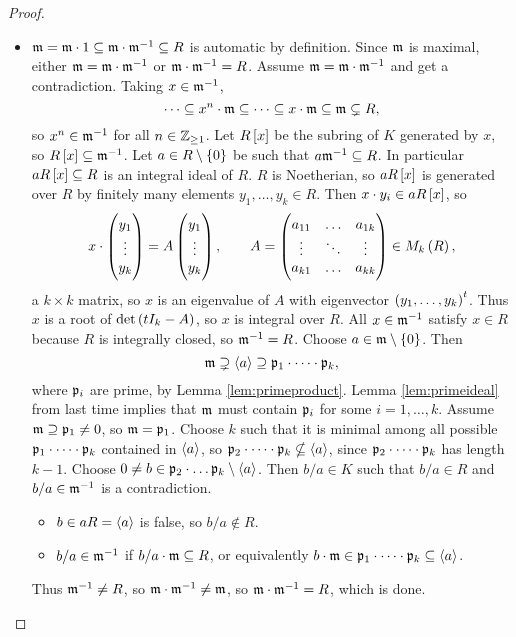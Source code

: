 \begin{proof}
\begin{itemize}
\item $ \mathfrak{m} = \mathfrak{m} \cdot 1 \subseteq \mathfrak{m} \cdot \mathfrak{m}^{-1} \subseteq R $ is automatic by definition. Since $ \mathfrak{m} $ is maximal, either $ \mathfrak{m} = \mathfrak{m} \cdot \mathfrak{m}^{-1} $ or $ \mathfrak{m} \cdot \mathfrak{m}^{-1} = R $. Assume $ \mathfrak{m} = \mathfrak{m} \cdot \mathfrak{m}^{-1} $ and get a contradiction. Taking $ x \in \mathfrak{m}^{-1} $,
$$ \dots \subseteq x^n \cdot \mathfrak{m} \subseteq \dots \subseteq x \cdot \mathfrak{m} \subseteq \mathfrak{m} \subsetneq R, $$
so $ x^n \in \mathfrak{m}^{-1} $ for all $ n \in \mathbb{Z}_{\ge 1} $. Let $ R\sbr{x} $ be the subring of $ K $ generated by $ x $, so $ R\sbr{x} \subseteq \mm^{-1} $. Let $ a \in R \setminus \cbr{0} $ be such that $ a\mathfrak{m}^{-1} \subseteq R $. In particular $ aR\sbr{x} \subseteq R $ is an integral ideal of $ R $. $ R $ is Noetherian, so $ aR\sbr{x} $ is generated over $ R $ by finitely many elements $ y_1, \dots, y_k \in R $. Then $ x \cdot y_i \in aR\sbr{x} $, so
$$ x \cdot \threebyone{y_1}{\vdots}{y_k} = A\threebyone{y_1}{\vdots}{y_k}, \qquad A = \threebythree{a_{11}}{\dots}{a_{1k}}{\vdots}{\ddots}{\vdots}{a_{k1}}{\dots}{a_{kk}} \in M_k\br{R}, $$
a $ k \times k $ matrix, so $ x $ is an eigenvalue of $ A $ with eigenvector $ \br{y_1, \dots, y_k}^t $. Thus $ x $ is a root of $ \det\br{tI_k - A} $, so $ x $ is integral over $ R $. All $ x \in \mathfrak{m}^{-1} $ satisfy $ x \in R $ because $ R $ is integrally closed, so $ \mathfrak{m}^{-1} = R $. Choose $ a \in \mm \setminus \cbr{0} $. Then
$$ \mathfrak{m} \supsetneq \left\langle a \right\rangle \supseteq \mathfrak{p}_1 \cdot \dots \cdot \mathfrak{p}_k, $$
where $ \mathfrak{p}_i $ are prime, by Lemma \ref{lem:primeproduct}. Lemma \ref{lem:primeideal} from last time implies that $ \mathfrak{m} $ must contain $ \mathfrak{p}_i $ for some $ i = 1, \dots, k $. Assume $ \mathfrak{m} \supseteq \mathfrak{p}_1 \ne 0 $, so $ \mathfrak{m} = \mathfrak{p}_1 $. Choose $ k $ such that it is minimal among all possible $ \mathfrak{p}_1 \cdot \dots \cdot \mathfrak{p}_k $ contained in $ \left\langle a \right\rangle $, so $ \mathfrak{p}_2 \cdot \dots \cdot \mathfrak{p}_k \nsubseteq \left\langle a \right\rangle $, since $ \mathfrak{p}_2 \cdot \dots \cdot \mathfrak{p}_k $ has length $ k - 1 $. Choose $ 0 \ne b \in \mathfrak{p}_2 \cdot \dots \mathfrak{p}_k \setminus \left\langle a \right\rangle $. Then $ b / a \in K $ such that $ b / a \in R $ and $ b / a \in \mathfrak{m}^{-1} $ is a contradiction.
\begin{itemize}
\item $ b \in aR = \left\langle a \right\rangle $ is false, so $ b / a \notin R $.
\item $ b / a \in \mathfrak{m}^{-1} $ if $ b / a \cdot \mathfrak{m} \subseteq R $, or equivalently $ b \cdot \mathfrak{m} \in \mathfrak{p}_1 \cdot \dots \cdot \mathfrak{p}_k \subseteq \left\langle a \right\rangle $.
\end{itemize}
Thus $ \mathfrak{m}^{-1} \ne R $, so $ \mathfrak{m} \cdot \mathfrak{m}^{-1} \ne \mathfrak{m} $, so $ \mathfrak{m} \cdot \mathfrak{m}^{-1} = R $, which is done.
\end{itemize}
\end{proof}


